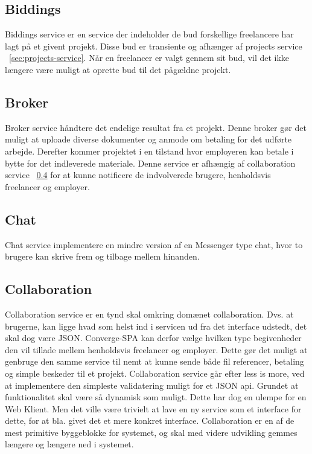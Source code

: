 \subsection{Biddings}
\label{sec:biddings-service}

Biddings service er en service der indeholder de bud forskellige freelancere har lagt på et givent projekt. Disse bud er transiente og afhænger af projects service ~\ref{sec:projects-service}. Når en freelancer er valgt gennem sit bud, vil det ikke længere være muligt at oprette bud til det pågældne projekt.

\subsection{Broker}
\label{sec:broker-service}

Broker service håndtere det endelige resultat fra et projekt. Denne broker gør det muligt at uploade diverse dokumenter og anmode om betaling for det udførte arbejde. Derefter kommer projektet i en tilstand hvor employeren kan betale i bytte for det indleverede materiale. Denne service er afhængig af collaboration service ~\ref{sec:collaboration-service} for at kunne notificere de indvolverede brugere, henholdsvis freelancer og employer.

\subsection{Chat}
\label{sec:chat-service}

Chat service implementere en mindre version af en Messenger type chat, hvor to brugere kan skrive frem og tilbage mellem hinanden.

\subsection{Collaboration}
\label{sec:collaboration-service}

Collaboration service er en tynd skal omkring domænet collaboration. Dvs. at brugerne, kan ligge hvad som helst ind i servicen ud fra det interface udstedt, det skal dog være JSON. Converge-SPA kan derfor vælge hvilken type begivenheder den vil tillade mellem henholdsvis freelancer og employer. Dette gør det muligt at genbruge den samme service til nemt at kunne sende både fil referencer, betaling og simple beskeder til et projekt. Collaboration service går efter less is more, ved at implementere den simpleste validatering muligt for et JSON api. Grundet at funktionalitet skal være så dynamisk som muligt. Dette har dog en ulempe for en Web Klient. Men det ville være trivielt at lave en ny service som et interface for dette, for at bla. givet det et mere konkret interface. Collaboration er en af de mest primitive byggeblokke for systemet, og skal med videre udvikling gemmes længere og længere ned i systemet.

